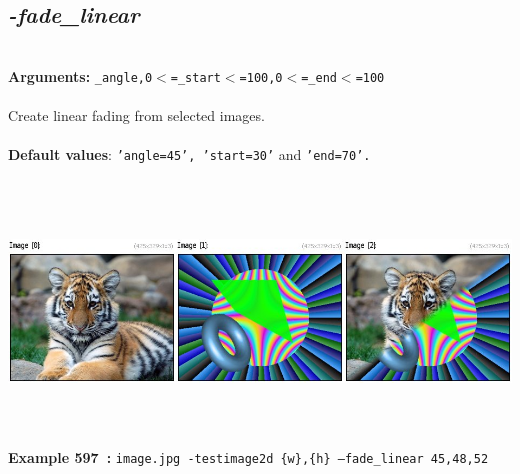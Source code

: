 \documentclass[a4paper,11pt,twoside]{book}
\begin{document}
\subsection{\emph{-fade\_linear} }\vspace*{-0.5em}
~\\\textbf{Arguments: } 
{\small \texttt{\_angle,0$<$=\_start$<$=100,0$<$=\_end$<$=100}}\\~\\
Create linear fading from selected images.
~\\~\\\textbf{Default values}: {\small \texttt{'angle=45', 'start=30'} and \texttt{'end=70'.}}
\begin{center}\includegraphics[keepaspectratio=true,height=7cm,width=\textwidth]{img/gmic_def597.jpg}\\
{\footnotesize \textbf{Example 597~:} \texttt{image.jpg -testimage2d \{w\},\{h\} --fade\_linear 45,48,52}}
\end{center}
\end{document}
